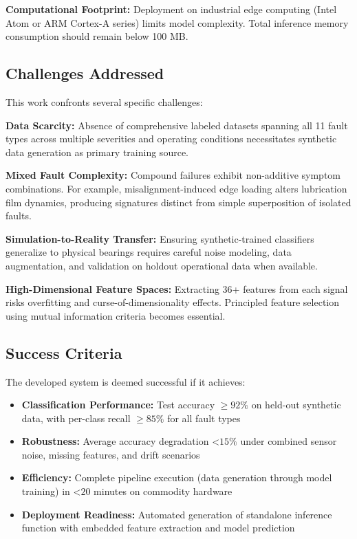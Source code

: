 \documentclass[11pt,a4paper]{article}
\begin{document}
\textbf{Computational Footprint:} Deployment on industrial edge computing (Intel Atom or ARM Cortex-A series) limits model complexity. Total inference memory consumption should remain below 100 MB.

\subsection{Challenges Addressed}

This work confronts several specific challenges:

\textbf{Data Scarcity:} Absence of comprehensive labeled datasets spanning all 11 fault types across multiple severities and operating conditions necessitates synthetic data generation as primary training source.

\textbf{Mixed Fault Complexity:} Compound failures exhibit non-additive symptom combinations. For example, misalignment-induced edge loading alters lubrication film dynamics, producing signatures distinct from simple superposition of isolated faults.

\textbf{Simulation-to-Reality Transfer:} Ensuring synthetic-trained classifiers generalize to physical bearings requires careful noise modeling, data augmentation, and validation on holdout operational data when available.

\textbf{High-Dimensional Feature Spaces:} Extracting 36+ features from each signal risks overfitting and curse-of-dimensionality effects. Principled feature selection using mutual information criteria becomes essential.

\subsection{Success Criteria}

The developed system is deemed successful if it achieves:

\begin{itemize}[leftmargin=*, itemsep=0.3em]
    \item \textbf{Classification Performance:} Test accuracy $\geq 92\%$ on held-out synthetic data, with per-class recall $\geq 85\%$ for all fault types
    \item \textbf{Robustness:} Average accuracy degradation $ $<$  15\%$ under combined sensor noise, missing features, and drift scenarios
    \item \textbf{Efficiency:} Complete pipeline execution (data generation through model training) in $ $<$  20$ minutes on commodity hardware
    \item \textbf{Deployment Readiness:} Automated generation of standalone inference function with embedded feature extraction and model prediction
\end{itemize}
\end{document}
